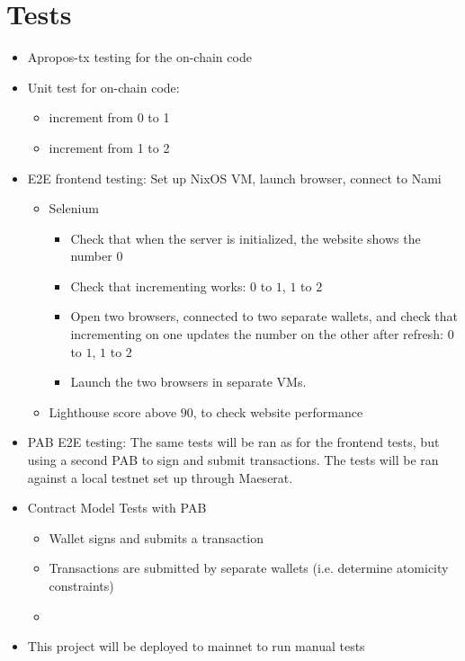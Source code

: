 \documentclass{article}
\begin{document}
\section{Tests}

\begin{itemize}
  \item Apropos-tx testing for the on-chain code
  \item Unit test for on-chain code:
  \begin{itemize}
    \item increment from 0 to 1
    \item increment from 1 to 2
  \end{itemize}
  \item E2E frontend testing: Set up NixOS VM, launch browser, connect to Nami
  \begin{itemize}
    \item Selenium
      \begin{itemize}
        \item Check that when the server is initialized, the website shows the
          number $0$
        \item Check that incrementing works: $0$ to $1$, $1$ to $2$
        \item Open two browsers, connected to two separate wallets, and check
          that incrementing on one updates the number on the other after
          refresh: $0$ to $1$, $1$ to $2$
        \item Launch the two browsers in separate VMs. 
      \end{itemize}
    \item Lighthouse score above $90$, to check website performance
  \end{itemize}
  \item PAB E2E testing: The same tests will be ran as for the frontend tests,
    but using a second PAB to sign and submit transactions.
    The tests will be ran against a local testnet set up through Maeserat.
  \item Contract Model Tests with PAB
  \begin{itemize}
    \item Wallet signs and submits a transaction
    \item Transactions are submitted by separate wallets (i.e. determine
      atomicity constraints)
    \item {}
  \end{itemize}
  \item This project will be deployed to mainnet to run manual tests
\end{itemize}
\end{document}
